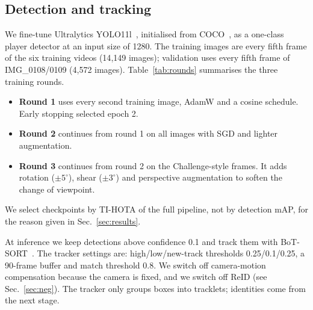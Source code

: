 \documentclass[11pt,a4paper]{article}
\begin{document}
\subsection{Detection and tracking}
\label{sec:det}
We fine-tune Ultralytics YOLO11l~\cite{yolo11}, initialised from COCO~\cite{coco}, as a one-class
player detector at an input size of 1280. The training images are every fifth frame of the six
training videos (14{,}149 images); validation uses every fifth frame of IMG\_0108/0109 (4{,}572 images).
Table~\ref{tab:rounds} summarises the three training rounds.
\begin{itemize}
\item \textbf{Round 1} uses every second training image, AdamW and a cosine schedule. Early stopping
selected epoch 2.
\item \textbf{Round 2} continues from round 1 on all images with SGD and lighter augmentation.
\item \textbf{Round 3} continues from round 2 on the Challenge-style frames. It adds rotation ($\pm5^\circ$),
shear ($\pm3^\circ$) and perspective augmentation to soften the change of viewpoint.
\end{itemize}
We select checkpoints by TI-HOTA of the full pipeline, not by detection mAP, for the reason given in
Sec.~\ref{sec:results}.

At inference we keep detections above confidence 0.1 and track them with BoT-SORT~\cite{botsort}. The
tracker settings are: high/low/new-track thresholds 0.25/0.1/0.25, a 90-frame buffer and match
threshold 0.8. We switch off camera-motion compensation because the camera is fixed, and we switch off
ReID (see Sec.~\ref{sec:neg}). The tracker only groups boxes into tracklets; identities come from the
next stage.

\begin{table}[t]
\centering
\caption{Detector fine-tuning rounds. The images are 720p frames from the six training videos. All rounds
use batch 5, image size 1280 and horizontal flips. mAP is measured on the validation frames of each round
(clean for r1/r2, Challenge-style for r3).}
\label{tab:rounds}
\small
{}
\end{table}
\end{document}
